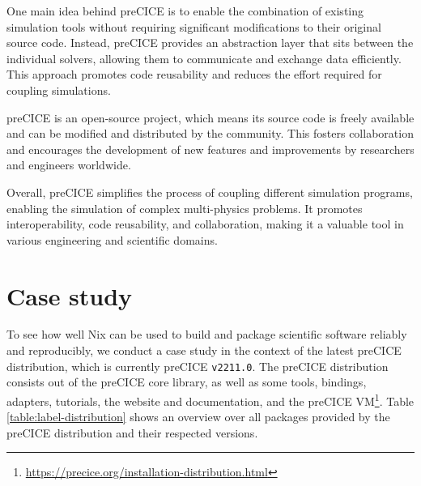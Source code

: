 \documentclass[conference,final,a4paper]{IEEEtran}
\begin{document}
One main idea behind preCICE is to enable the combination of existing simulation tools without requiring significant modifications to their original source code.
Instead, preCICE provides an abstraction layer that sits between the individual solvers, allowing them to communicate and exchange data efficiently.
This approach promotes code reusability and reduces the effort required for coupling simulations.

preCICE is an open-source project, which means its source code is freely available and can be modified and distributed by the community.
This fosters collaboration and encourages the development of new features and improvements by researchers and engineers worldwide.

Overall, preCICE simplifies the process of coupling different simulation programs, enabling the simulation of complex multi-physics problems.
It promotes interoperability, code reusability, and collaboration, making it a valuable tool in various engineering and scientific domains.

\section{Case study}

To see how well Nix can be used to build and package scientific software reliably and reproducibly, we conduct a case study in the context of the latest preCICE distribution, which is currently preCICE \texttt{v2211.0}.
The preCICE distribution consists out of the preCICE core library, as well as some tools, bindings, adapters, tutorials, the website and documentation, and the preCICE VM\footnote{\url{https://precice.org/installation-distribution.html}}.
Table \ref{table:label-distribution} shows an overview over all packages provided by the preCICE distribution and their respected versions.
\end{document}
